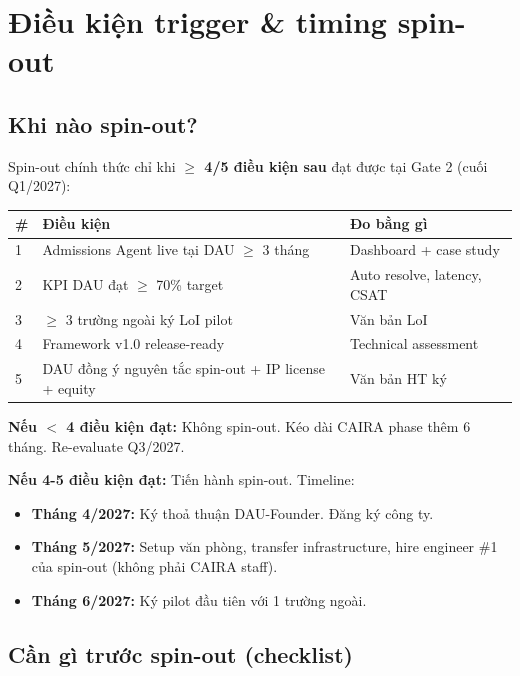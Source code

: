 \documentclass[11pt,a4paper]{article}
\begin{document}
\section{Điều kiện trigger \& timing spin-out}

\subsection{Khi nào spin-out?}

Spin-out chính thức chỉ khi \textbf{$\geq$ 4/5 điều kiện sau} đạt được tại Gate 2
(cuối Q1/2027):

\begin{tabularx}{\linewidth}{@{}p{0.5cm} p{4.5cm} X@{}}
\toprule
\textbf{\#} & \textbf{Điều kiện} & \textbf{Đo bằng gì} \\
\midrule
1 & Admissions Agent live tại DAU $\geq$ 3 tháng & Dashboard + case study \\
2 & KPI DAU đạt $\geq$ 70\% target & Auto resolve, latency, CSAT \\
3 & $\geq$ 3 trường ngoài ký LoI pilot & Văn bản LoI \\
4 & Framework v1.0 release-ready & Technical assessment \\
5 & DAU đồng ý nguyên tắc spin-out + IP license + equity & Văn bản HT ký \\
\bottomrule
\end{tabularx}

\textbf{Nếu $<$ 4 điều kiện đạt:} Không spin-out. Kéo dài CAIRA phase thêm 6
tháng. Re-evaluate Q3/2027.

\textbf{Nếu 4-5 điều kiện đạt:} Tiến hành spin-out. Timeline:

\begin{itemize}
\item \textbf{Tháng 4/2027:} Ký thoả thuận DAU-Founder. Đăng ký công ty.
\item \textbf{Tháng 5/2027:} Setup văn phòng, transfer infrastructure, hire engineer \#1 của spin-out (không phải CAIRA staff).
\item \textbf{Tháng 6/2027:} Ký pilot đầu tiên với 1 trường ngoài.
\end{itemize}

\subsection{Cần gì trước spin-out (checklist)}
\end{document}
